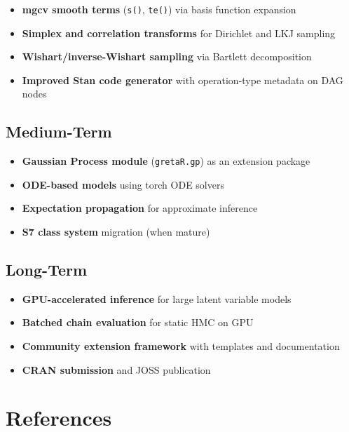 \documentclass[
  11pt,
]{article}
\providecommand{\tightlist}{%
  \setlength{\itemsep}{0pt}\setlength{\parskip}{0pt}}
\begin{document}
\begin{itemize}
\tightlist
\item
  \textbf{mgcv smooth terms} (\texttt{s()}, \texttt{te()}) via basis
  function expansion
\item
  \textbf{Simplex and correlation transforms} for Dirichlet and LKJ
  sampling
\item
  \textbf{Wishart/inverse-Wishart sampling} via Bartlett decomposition
\item
  \textbf{Improved Stan code generator} with operation-type metadata on
  DAG nodes
\end{itemize}

\subsection{Medium-Term}\label{medium-term}

\begin{itemize}
\tightlist
\item
  \textbf{Gaussian Process module} (\texttt{gretaR.gp}) as an extension
  package
\item
  \textbf{ODE-based models} using torch ODE solvers
\item
  \textbf{Expectation propagation} for approximate inference
\item
  \textbf{S7 class system} migration (when mature)
\end{itemize}

\subsection{Long-Term}\label{long-term}

\begin{itemize}
\tightlist
\item
  \textbf{GPU-accelerated inference} for large latent variable models
\item
  \textbf{Batched chain evaluation} for static HMC on GPU
\item
  \textbf{Community extension framework} with templates and
  documentation
\item
  \textbf{CRAN submission} and JOSS publication
\end{itemize}

\section*{References}\label{references}
\end{document}
